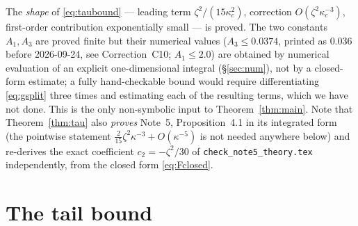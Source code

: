 \documentclass[11pt]{article}
\begin{document}
\begin{verdictgap}
The \emph{shape} of \eqref{eq:taubound} --- leading term $\zeta^2/(15\kappa_c^2)$, correction
$O(\zeta^2\kappa_c^{-3})$, first-order contribution exponentially small --- is proved.  The two
constants $A_1,A_3$ are proved finite but their numerical values ($A_3\le0.0374$, printed as $0.036$ before 2026-09-24, see Correction~C10; $A_1\le2.0$) are
obtained by numerical evaluation of an explicit one-dimensional integral (\S\ref{sec:num}), not by a
closed-form estimate; a fully hand-checkable bound would require differentiating \eqref{eq:gsplit}
three times and estimating each of the resulting terms, which we have not done.  This is the only
non-symbolic input to Theorem~\ref{thm:main}.  Note that Theorem~\ref{thm:tau} also \emph{proves}
Note~5, Proposition~4.1 in its integrated form (the pointwise statement $\frac2{15}\zeta^2\kappa^{-3}
+O(\kappa^{-5})$ is not needed anywhere below) and re-derives the exact coefficient
$c_2=-\zeta^2/30$ of \texttt{check\_note5\_theory.tex} independently, from the closed form
\eqref{eq:Fclosed}.
\end{verdictgap}

\section{The tail bound}\label{sec:tail}
\end{document}
